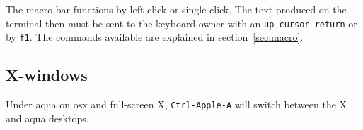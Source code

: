 \documentclass[12pt]{article}
\begin{document}
The macro bar functions by left-click or single-click. The text
produced on the terminal then must be sent to the keyboard owner with
an \verb$up-cursor return$ or by \verb$f1$. The commands available are
explained in section~\ref{sec:macro}.

\subsection{X-windows}

Under aqua on osx and full-screen X, \verb$Ctrl-Apple-A$ will switch
between the X and aqua desktops.


\end{document}
